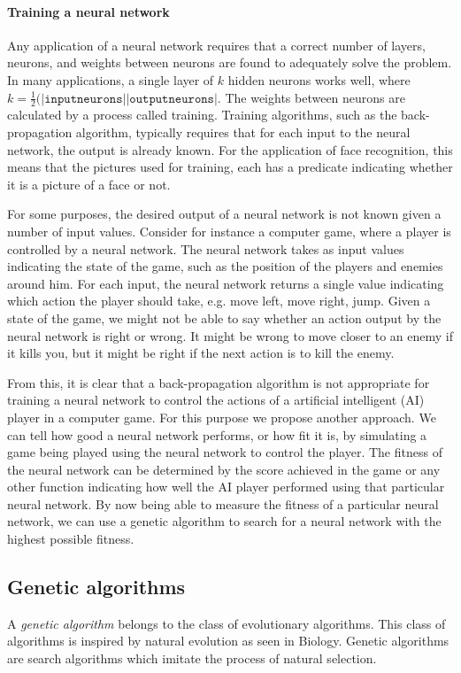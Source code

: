 \paragraph{Training a neural network}
Any application of a neural network requires that a correct number of layers, neurons, and weights between
neurons are found to adequately solve the problem. In many applications, a single layer of $k$ hidden neurons works well, where $k = \frac{1}{2}(|\mathtt{input neurons}| |\mathtt{output neurons}|$.
The weights between neurons are calculated by a process called training. Training algorithms, such as the
back-propagation algorithm, typically requires that for each input to the neural network, the output is already known.
For the application of face recognition, this means that the pictures used for training,
each has a predicate indicating whether it is a picture of a face or not.  

For some purposes, the desired output of a neural network is not known given a number of input values.
Consider for instance a computer game, where a player is controlled by a neural network. 
The neural network takes as input values indicating the state of the game, such as the position of the players
and enemies around him. For each input, the neural network returns a single value indicating which action the
player should take, e.g. move left, move right, jump. Given a state of the game, we might not be able to say
whether an action output by the neural network is right or wrong. It might be wrong to move closer to
an enemy if it kills you, but it might be right if the next action is to kill the enemy.

From this, it is clear that a back-propagation algorithm is not appropriate for training a neural network
to control the actions of a artificial intelligent (AI) player in a computer game. For this purpose
we propose another approach. We can tell how good a neural network performs, or how fit it is,
by simulating a game being played using the neural network to control the player. 
The fitness of the neural network can be determined by the score achieved in the game or
any other function indicating how well the AI player performed using that particular neural network.
By now being able to measure the fitness of a particular neural network, we can use a genetic algorithm
to search for a neural network with the highest possible fitness.

\subsection{Genetic algorithms}
A \emph{genetic algorithm} belongs to the class of evolutionary algorithms. This class of algorithms is inspired by natural evolution as seen in Biology. Genetic algorithms are search algorithms which imitate the process of natural selection.

